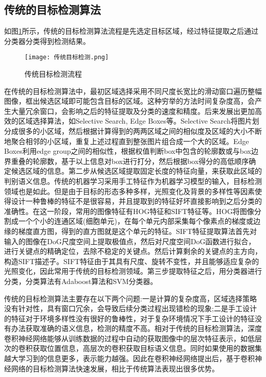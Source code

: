 \subsection{传统的目标检测算法}
如图\ref{ct}所示，传统的目标检测算法流程是先选定目标区域，经过特征提取之后通过分类器分类得到检测结果。

\begin{figure}[htbp]
    \centering
    \texttt{[image: 传统目标检测.png]}
    \caption{传统目标检测流程}
    \label{ct}
\end{figure}

在传统的目标检测算法中，最初区域选择采用不同尺度长宽比的滑动窗口遍历整幅图像，框出候选区域即可能包含目标的区域\cite{胡伏原2020基于卷积神经网络的目标检测算法综述,kira1992feature}。这种穷举的方法时间复杂度高，会产生大量冗余窗口，会影响之后的特征提取及分类的速度和精度。后来发展出更加高效的区域选择算法，如Selective Search\cite{uijlings2013selective},  Edge Boxes\cite{zitnick2014edge}等。Selective Search将图片划分成很多的小区域，然后根据计算得到的两两区域之间的相似度及区域的大小不断地聚合相邻的小区域，重复上述过程直到整张图片组合成一个大的区域。Edge Boxes利用edge group之间的相似性，根据权值判断box中包含的轮廓数或与box边界重叠的轮廓数，基于以上信息对box进行打分，然后根据box得分的高低顺序确定候选区域的信息。第二步从候选区域提取固定长度的特征向量，来获取此区域的判别语义信息。传统的机器学习采用手工特征作为机器学习模型的输入，目标检测领域也是如此。但是由于目标的形态多种多样，光照变化及背景的多样性等因素使得设计一种鲁棒的特征不是很容易，并且提取到的特征好坏直接影响到之后分类的准确性。在这一阶段，常用的图像特征有HOG特征\cite{he1990texture}和SIFT特征\cite{lowe1999object}等。HOG将图像分割成一个个小的连通区域(细胞单元)，在每个单元内部采集每个像素点的梯度或边缘的梯度直方图，得到的直方图就是这个单元的特征。SIFT特征提取算法首先对输入的图像在DoG尺度空间上提取极值点，然后对尺度空间DoG函数进行拟合，进行关键点的精确定位，去除不稳定的关键点。然后计算剩余的关键点的主方向，构造SIFT描述子。SIFT特征由于其具有尺度、旋转不变性，并且能够适应复杂的光照变化，因此常用于传统的目标检测领域。第三步提取特征之后，用分类器进行分类，分类算法有Adaboost算法\cite{freund1997decision}和SVM分类器\cite{cortes1995support}。

传统的目标检测算法主要存在以下两个问题:一是计算的复杂度高，区域选择策略没有针对性，具有窗口冗余，会导致后续分类过程出现错检的现象;二是手工设计的特征对于环境多样性没有很好的鲁棒性，对于复杂环境情况下手工设计的特征没有办法获取准确的语义信息，检测的精度不高。相对于传统的目标检测算法，深度卷积神经网络能够从训练数据的过程中自动的获取图像中的层次特征表示，如低层次的卷积获取位置信息，高层次的卷积获取目标语义信息。同时如果使用的数据集越大学习到的信息更多，表示能力越强。因此在卷积神经网络提出后，基于卷积神经网络的目标检测算法快速发展，相比于传统算法表现出很多优势。

